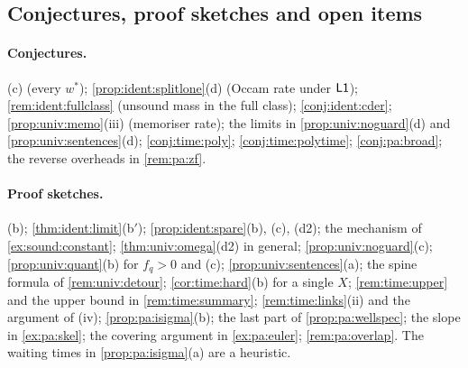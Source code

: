 \subsection{Conjectures, proof sketches and open items}\label{app:ver:sketches}

\paragraph{Conjectures.}
(c) (every $w^*$);
\cref{prop:ident:splitlone}(d) (Occam rate under $\mathord{\mathsf{L1}}$);
\cref{rem:ident:fullclass} (unsound mass in the full class);
\cref{conj:ident:cder};
\cref{prop:univ:memo}(iii) (memoriser rate);
the limits in \cref{prop:univ:noguard}(d) and \cref{prop:univ:sentences}(d);
\cref{conj:time:poly};
\cref{conj:time:polytime};
\cref{conj:pa:broad};
the reverse overheads in \cref{rem:pa:zf}.

\paragraph{Proof sketches.}
(b);
\cref{thm:ident:limit}(b$'$);
\cref{prop:ident:spare}(b), (c), (d2);
the mechanism of \cref{ex:sound:constant};
\cref{thm:univ:omega}(d2) in general;
\cref{prop:univ:noguard}(c);
\cref{prop:univ:quant}(b) for $f_q>0$ and (c);
\cref{prop:univ:sentences}(a);
the spine formula of \cref{rem:univ:detour};
\cref{cor:time:hard}(b) for a single $X$;
\cref{rem:time:upper} and the upper bound in \cref{rem:time:summary};
\cref{rem:time:links}(ii) and the argument of (iv);
\cref{prop:pa:isigma}(b);
the last part of \cref{prop:pa:wellspec};
the slope in \cref{ex:pa:skel};
the covering argument in \cref{ex:pa:euler};
\cref{rem:pa:overlap}.
The waiting times in \cref{prop:pa:isigma}(a) are a heuristic.

